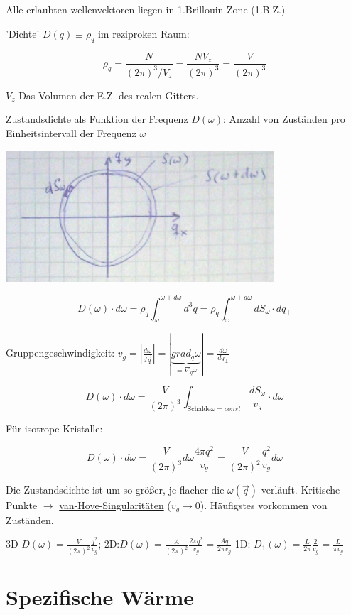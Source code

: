 Alle erlaubten wellenvektoren liegen in 1.Brillouin-Zone (1.B.Z.)

'Dichte' \(D(q)\equiv\rho_q\) im reziproken Raum: 

\[\rho_q=\frac{N}{(2\pi)^3/V_z}=\frac{NV_z}{(2\pi)^3}=\frac{V}{(2\pi)^3}\]

\(V_z\)-Das Volumen der E.Z. des realen Gitters.

Zustandsdichte als Funktion der Frequenz \(D(\omega)\): Anzahl von Zuständen pro Einheitsintervall der Frequenz \(\omega\)

\includegraphics[width=0.75\textwidth]{kap06_12.png}

\[ D(\omega)\cdot d\omega = \rho_q\int^{\omega+d\omega}_\omega d^3q = \rho_q\int^{\omega+d\omega}_\omega dS_\omega\cdot dq_\bot\]

Gruppengeschwindigkeit: \(v_g=\left|\frac{d\omega}{d\vec q}\right| = \left|\underbrace{grad_q\omega}_{\equiv \nabla_q \omega} \right|=\frac{d\omega}{dq_\bot}\)

\[ D(\omega)\cdot d\omega = \frac{V}{(2\pi)^3}\int_{\text{Schalde}\omega=const} \frac{dS_\omega}{v_g}\cdot d\omega\]

Für isotrope Kristalle:

\[ D(\omega)\cdot d\omega = \frac{V}{(2\pi)^3} d\omega \frac{4\pi q^2}{v_g} =\frac{V}{(2\pi)^2} \frac{q^2}{v_g}  d\omega \]

Die Zustandsdichte ist um so größer, je flacher die \(\omega(\vec q)\) verläuft. Kritische Punkte \(\rightarrow\) \underline{van-Hove-Singularitäten} (\(v_g\rightarrow 0\)). Häufigstes vorkommen von Zuständen.

3D \( D(\omega) = \frac{V}{(2\pi)^2} \frac{q^2}{v_g} \); 2D:\( D(\omega) = \frac{A}{(2\pi)^2} \frac{2\pi q^2}{v_g}=\frac{Aq}{2\pi v_g}\) 1D: \( D_1(\omega) = \frac{L}{2\pi}  \frac{2}{v_g}=\frac{L}{\pi v_g} \)

\section{Spezifische Wärme}

